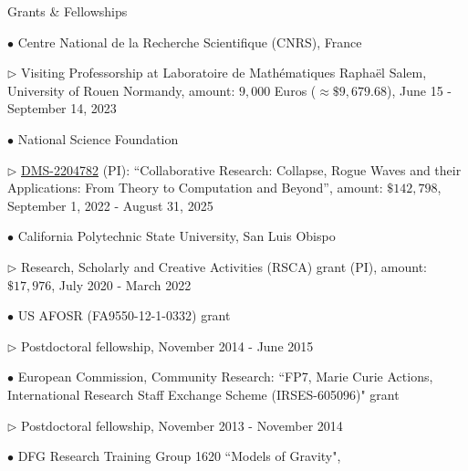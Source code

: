 \documentclass[10pt]{article} %
\newenvironment{outerlist}[1][\enskip\textbullet]%
        {\begin{itemize}[#1]}{\end{itemize}%
         \vspace{-.6\baselineskip}}
\newenvironment{innerlist}[1][\enskip\textbullet]%
        {\begin{compactitem}[#1]}{\end{compactitem}}
\begin{document}
\begin{section}{Grants \& Fellowships}
\begin{outerlist}
\item[$\bullet$]
\vskip -7mm Centre National de la Recherche Scientifique (CNRS), France
\begin{innerlist}
\item[$\triangleright$] Visiting Professorship at Laboratoire de Math\'ematiques
Rapha\"el Salem, University of Rouen Normandy, amount: $9,000$ Euros ($\approx \$ 9,679.68$),
June 15 - September 14, 2023
\end{innerlist}
\item[$\bullet$]
National Science Foundation
\begin{innerlist}
\item[$\triangleright$] \href{https://www.nsf.gov/awardsearch/showAward?AWD_ID=2204782&HistoricalAwards=false}{DMS-2204782} (PI): %
``Collaborative Research: Collapse, Rogue Waves and their Applications: From Theory to Computation and Beyond'', %
amount: $\$142,798$, September 1, 2022 - August 31, 2025 
\end{innerlist}
\item[$\bullet$]
California Polytechnic State University, San Luis Obispo
\begin{innerlist} 
\item[$\triangleright$] Research, Scholarly and Creative Activities (RSCA)
grant (PI), amount: $\$17,976$, July 2020 - March 2022
\end{innerlist}
\item[$\bullet$]
US AFOSR (FA9550-12-1-0332) grant
\begin{innerlist}
\item[$\triangleright$] Postdoctoral fellowship, November 2014 - June 2015
\end{innerlist}
\item[$\bullet$] European Commission, Community Research: ``FP7, Marie Curie 
Actions, International Research Staff Exchange Scheme (IRSES-605096)" grant
\begin{innerlist}
\item[$\triangleright$] Postdoctoral fellowship, November 2013 - November 2014
\end{innerlist}
\item[$\bullet$] DFG Research Training Group 1620 ``Models of Gravity", 

\end{outerlist}
\end{section}
\end{document}
